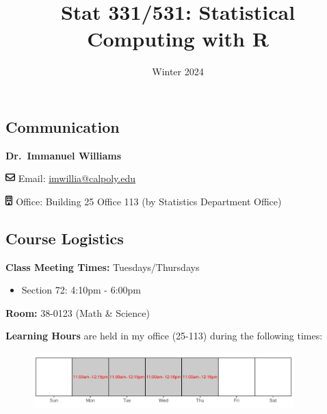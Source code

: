 \documentclass[
  11pt,
  letterpaper,
  DIV=11,
  numbers=noendperiod]{scrartcl}
\title{Stat 331/531: Statistical Computing with R}
\subtitle{Winter 2024}
\author{}
\date{}
\providecommand{\tightlist}{%
  \setlength{\itemsep}{0pt}\setlength{\parskip}{0pt}}\usepackage{longtable,booktabs,array}
\begin{document}
\maketitle
\ifdefined\Shaded\renewenvironment{Shaded}{\begin{tcolorbox}[borderline west={3pt}{0pt}{shadecolor}, frame hidden, interior hidden, sharp corners, boxrule=0pt, enhanced, breakable]}{\end{tcolorbox}}\fi

\hypertarget{communication}{%
\subsection{Communication}\label{communication}}

\textbf{Dr.~Immanuel Williams}

\includegraphics[width=1em,height=1em]{index_files/figure-pdf/fa-icon-a7ff419e70980f9f1a65816048d94526.pdf}
Email:
\href{mailto:imwillia@calpoly.edu?subject=Stat\%20331/531}{imwillia@calpoly.edu}

\includegraphics[width=0.75em,height=1em]{index_files/figure-pdf/fa-icon-443d06266e96702cc4dd4ffb1304f584.pdf}
Office: Building 25 Office 113 (by Statistics Department Office)

\hypertarget{course-logistics}{%
\subsection{Course Logistics}\label{course-logistics}}

\textbf{Class Meeting Times:} Tuesdays/Thursdays

\begin{itemize}
\tightlist
\item
  Section 72: 4:10pm - 6:00pm
\end{itemize}

\textbf{Room:} 38-0123 (Math \& Science)

\textbf{Learning Hours} are held in my office (25-113) during the
following times:

\begin{figure}[H]

{\centering \includegraphics[width=0.9\textwidth,height=\textheight]{index_files/figure-pdf/unnamed-chunk-2-1.pdf}

}

\end{figure}
\end{document}

